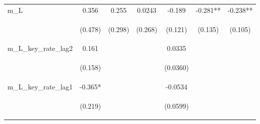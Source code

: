 \documentclass[]{article}
\begin{document}
\begin{center}
\begin{tabular}{lcccccc}
m\_L & 0.356 & 0.255 & 0.0243 & -0.189 & -0.281** & -0.238** \\
\vspace{4pt} & \begin{footnotesize}(0.478)\end{footnotesize} & \begin{footnotesize}(0.298)\end{footnotesize} & \begin{footnotesize}(0.268)\end{footnotesize} & \begin{footnotesize}(0.121)\end{footnotesize} & \begin{footnotesize}(0.135)\end{footnotesize} & \begin{footnotesize}(0.105)\end{footnotesize} \\
m\_L\_key\_rate\_lag2 & 0.161 &  &  & 0.0335 &  &  \\
\vspace{4pt} & \begin{footnotesize}(0.158)\end{footnotesize} & \begin{footnotesize}\end{footnotesize} & \begin{footnotesize}\end{footnotesize} & \begin{footnotesize}(0.0360)\end{footnotesize} & \begin{footnotesize}\end{footnotesize} & \begin{footnotesize}\end{footnotesize} \\
m\_L\_key\_rate\_lag1 & -0.365* &  &  & -0.0534 &  &  \\
\vspace{4pt} & \begin{footnotesize}(0.219)\end{footnotesize} & \begin{footnotesize}\end{footnotesize} & \begin{footnotesize}\end{footnotesize} & \begin{footnotesize}(0.0599)\end{footnotesize} & \begin{footnotesize}\end{footnotesize} & \begin{footnotesize}\end{footnotesize} \\

\end{tabular}
\end{center}
\end{document}
